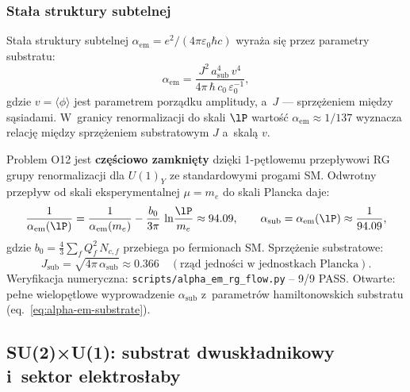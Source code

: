 \subsubsection{Stała struktury subtelnej}

\begin{proposition}%
\label{prop:alpha-em}
Stała struktury subtelnej $\alpha_{\mathrm{em}} = e^2/(4\pi\varepsilon_0\hbar c)$
wyraża się przez parametry substratu:
\begin{equation}\label{eq:alpha-em-substrate}
    \alpha_{\mathrm{em}}
    = \frac{J^2\,a_{\mathrm{sub}}^4\,v^4}
           {4\pi\,\hbar\,c_0\,\varepsilon_0^{-1}},
\end{equation}
gdzie $v = \langle\phi\rangle$ jest parametrem porządku amplitudy,
a~$J$ --- sprzężeniem między sąsiadami. W~granicy renormalizacji
do skali $\lP$ wartość $\alpha_{\mathrm{em}} \approx 1/137$
wyznacza relację między sprzężeniem substratowym $J$ a~skalą $v$.
\end{proposition}

\begin{remark}%
\label{rem:O12-closed}
Problem O12 jest \textbf{częściowo zamknięty} dzięki 1-pętlowemu przepływowi
RG grupy renormalizacji dla $U(1)_Y$ ze standardowymi progami SM.
Odwrotny przepływ od skali eksperymentalnej $\mu = m_e$ do skali Plancka daje:
\begin{equation}\label{eq:alpha-Planck}
    \frac{1}{\alpha_{\mathrm{em}}(\lP)}
    = \frac{1}{\alpha_{\mathrm{em}}(m_e)}
      - \frac{b_0}{3\pi}\,\ln\!\frac{\lP}{m_e}
    \approx 94.09,
    \qquad
    \alpha_{\mathrm{sub}} = \alpha_{\mathrm{em}}(\lP) \approx \frac{1}{94.09},
\end{equation}
gdzie $b_0 = \tfrac{4}{3}\sum_f Q_f^2\,N_{c,f}$ przebiega po fermionach SM.
Sprzężenie substratowe:
\begin{equation}\label{eq:J-substrate-alpha}
    J_{\mathrm{sub}}
    = \sqrt{4\pi\,\alpha_{\mathrm{sub}}}
    \approx 0.366
    \quad (\text{rząd jedności w jednostkach Plancka}).
\end{equation}
Weryfikacja numeryczna: \texttt{scripts/alpha\_em\_rg\_flow.py} -- 9/9 PASS\@.
Otwarte: pełne wielopętlowe wyprowadzenie $\alpha_{\mathrm{sub}}$ z~parametrów
hamiltonowskich substratu (eq.~\eqref{eq:alpha-em-substrate}).
\end{remark}

\subsection{SU(2)×U(1): substrat dwuskładnikowy i~sektor
  elektrosłaby}\label{ssec:su2u1}\label{ssec:su2-su3}

